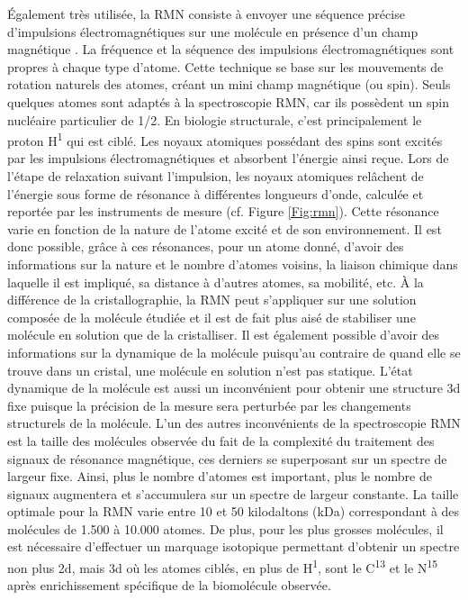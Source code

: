 Également très utilisée, la RMN consiste à envoyer une séquence précise d'impulsions électromagnétiques sur une molécule en présence d'un champ magnétique \cite{wuthrich1986nmr}. La fréquence et la séquence des impulsions électromagnétiques sont propres à chaque type d'atome. Cette technique se base sur les mouvements de rotation naturels des atomes, créant un mini champ magnétique (ou spin). Seuls quelques atomes sont adaptés à la spectroscopie RMN, car ils possèdent un spin nucléaire particulier de 1/2. En biologie structurale, c'est principalement le proton H\textsuperscript{1} qui est ciblé. Les noyaux atomiques possédant des spins sont excités par les impulsions électromagnétiques et absorbent l'énergie ainsi reçue. Lors de l'étape de relaxation suivant l'impulsion, les noyaux atomiques relâchent de l'énergie sous forme de résonance à différentes longueurs d'onde, calculée et reportée par les instruments de mesure (cf. Figure \ref{Fig:rmn}). Cette résonance varie en fonction de la nature de l'atome excité et de son environnement. Il est donc possible, grâce à ces résonances, pour un atome donné, d'avoir des informations sur la nature et le nombre d'atomes voisins, la liaison chimique dans laquelle il est impliqué, sa distance à d'autres atomes, sa mobilité, etc. À la différence de la cristallographie, la RMN peut s'appliquer sur une solution composée de la molécule étudiée et il est de fait plus aisé de stabiliser une molécule en solution que de la cristalliser. Il est également possible d'avoir des informations sur la dynamique de la molécule puisqu'au contraire de quand elle se trouve dans un cristal, une molécule en solution n'est pas statique.
L'état dynamique de la molécule est aussi un inconvénient pour obtenir une structure 3d fixe puisque la précision de la mesure sera perturbée par les changements structurels de la molécule. L'un des autres inconvénients de la spectroscopie RMN est la taille des molécules observée du fait de la complexité du traitement des signaux de résonance magnétique, ces derniers se superposant sur un spectre de largeur fixe. Ainsi, plus le nombre d'atomes est important, plus le nombre de signaux augmentera et s'accumulera sur un spectre de largeur constante. La taille optimale pour la RMN varie entre 10 et 50 kilodaltons (kDa) correspondant à des molécules de 1.500 à 10.000 atomes. De plus, pour les plus grosses molécules, il est nécessaire d'effectuer un marquage isotopique permettant d'obtenir un spectre non plus 2d, mais 3d où les atomes ciblés, en plus de H\textsuperscript{1}, sont le C\textsuperscript{13} et le N\textsuperscript{15} après enrichissement spécifique de la biomolécule observée.

